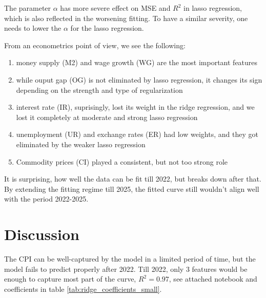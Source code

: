 \documentclass{article}
\begin{document}
The parameter $\alpha$ has more severe effect on MSE and $R^2$ in lasso regression,
which is also reflected in the worsening fitting. To have a similar severity,
one needs to lower the $\alpha$ for the lasso regression.

From an econometrics point of view, we see the following:
\begin{enumerate}
      \item  money supply (M2) and wage growth (WG) are the most important features
      \item while ouput gap (OG) is not eliminated by lasso regression,
            it changes its sign depending on the strength and type of regularization
      \item interest rate (IR), suprisingly, lost its weight in the ridge regression,
            and we lost it completely at moderate and strong lasso regression
      \item unemployment (UR) and exchange rates (ER) had low weights,
            and they got eliminated by the weaker lasso regression
      \item Commodity prices (CI) played a consistent, but not too strong role
\end{enumerate}

It is surprising, how well the data can be fit till 2022, but breaks down after that.
By extending the fitting regime till 2025, the fitted curve still wouldn't align well with the
period 2022-2025.

\section*{Discussion}
The CPI can be well-captured by the model in a limited period of time,
but the model fails to predict properly after 2022. Till 2022,
only 3 features would be enough to capture most part of the curve,
$R^2 = 0.97$, see attached notebook and coefficients in table \ref{tab:ridge_coefficients_small}.
\end{document}
